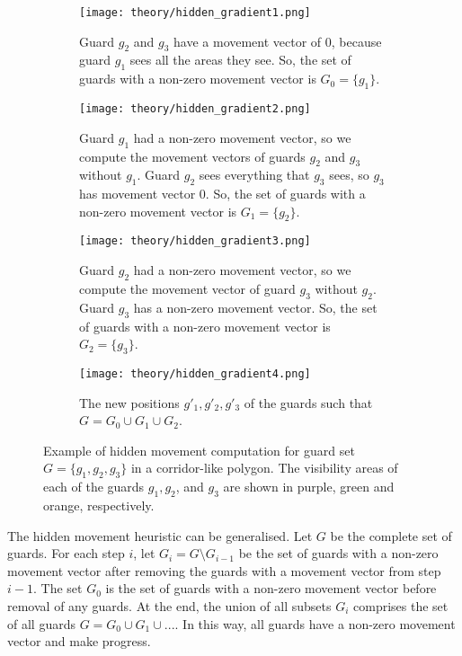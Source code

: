 \begin{figure}[h!]
    \centering
    \begin{subfigure}{0.45\textwidth}
        \texttt{[image: theory/hidden\_gradient1.png]}
        \caption{Guard $g_2$ and $g_3$ have a movement vector of 0, because guard $g_1$ sees all the areas they see. So, the set of guards with a non-zero movement vector is $G_0 = \{g_1\}$.}
        \label{fig:hidden_gradient1}
    \end{subfigure}
    \hfill
    \begin{subfigure}{0.45\textwidth}
        \texttt{[image: theory/hidden\_gradient2.png]}
        \caption{Guard $g_1$ had a non-zero movement vector, so we compute the movement vectors of guards $g_2$ and $g_3$ without $g_1$. Guard $g_2$ sees everything that $g_3$ sees, so $g_3$ has movement vector 0. So, the set of guards with a non-zero movement vector is $G_1 = \{g_2\}$.}
        \label{fig:hidden_gradient2}
    \end{subfigure}
    \begin{subfigure}{0.45\textwidth}
        \texttt{[image: theory/hidden\_gradient3.png]}
        \caption{Guard $g_2$ had a non-zero movement vector, so we compute the movement vector of guard $g_3$ without $g_2$. Guard $g_3$ has a non-zero movement vector. So, the set of guards with a non-zero movement vector is $G_2 = \{g_3\}$.}
        \label{fig:hidden_gradient3}
    \end{subfigure}
    \hfill
    \begin{subfigure}{0.45\textwidth}
        \texttt{[image: theory/hidden\_gradient4.png]}
        \caption{The new positions $g'_1, g'_2, g'_3$ of the guards such that $G = G_0 \cup G_1 \cup G_2$.}
        \label{fig:hidden_gradient4}
    \end{subfigure}
    \caption{Example of hidden movement computation for guard set $G = \{g_1, g_2, g_3\}$ in a corridor-like polygon. The visibility areas of each of the guards $g_1, g_2$, and $g_3$ are shown in purple, green and orange, respectively.}
    \label{fig:hidden_gradient}
\end{figure}

The hidden movement heuristic can be generalised. Let $G$ be the complete set of guards. For each step $i$, let $G_i = G \setminus G_{i - 1}$ be the set of guards with a non-zero movement vector after removing the guards with a movement vector from step $i - 1$. The set $G_0$ is the set of guards with a non-zero movement vector before removal of any guards. At the end, the union of all subsets $G_i$ comprises the set of all guards $G = G_0 \cup G_1 \cup ...$.
In this way, all guards  have a non-zero movement vector and make progress.


